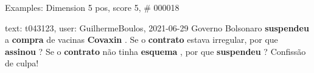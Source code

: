 \begin{frame}{Examples: Dimension 5 pos, score 5, \# 000018}
\footnotesize
\begin{exampleblock}{text: t043123, user: GuilhermeBoulos, 2021-06-29}
Governo Bolsonaro \textbf{suspendeu} a \textbf{compra} de vacinas 
\textbf{Covaxin} . Se o \textbf{contrato} estava irregular, por que 
\textbf{assinou} ? Se o \textbf{contrato} não tinha \textbf{esquema} , por que 
\textbf{suspendeu} ? Confissão de culpa! 
\end{exampleblock}
\end{frame}
